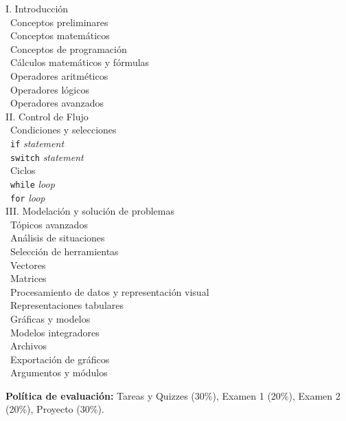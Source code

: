 \documentclass[12pt, letterpaper, oneside]{article}
\newcommand{\topic}{{\color{darkgreen}{\Rectangle}}}
\newcommand{\subtopic}{{\enskip \color{darkblue}{\Rectangle}}}
\begin{document}
  \begin{center} 
  \begin{minipage}{5in}
  \begin{flushleft}
  {\large I. Introducción} \\[2ex]
  \topic ~Conceptos preliminares \\
  \subtopic ~Conceptos matemáticos \\
  \subtopic ~Conceptos de programación \\
  \topic ~Cálculos matemáticos y fórmulas \\
  \subtopic ~Operadores aritméticos \\
  \subtopic ~Operadores lógicos \\
  \subtopic ~Operadores avanzados \\[2.5ex]
  {\large II. Control de Flujo } \\[2ex]
  \topic ~Condiciones y selecciones \\
  \subtopic ~\texttt{if} \textit{statement} \\
  \subtopic ~\texttt{switch} \textit{statement} \\
  \topic ~Ciclos \\
  \subtopic ~\texttt{while} \textit{loop} \\
  \subtopic ~\texttt{for} \textit{loop}\\[2.5ex]
  {\large III. Modelación y solución de problemas} \\[2ex]
  \topic ~Tópicos avanzados \\
  \subtopic ~Análisis de situaciones \\
  \subtopic ~Selección de herramientas \\
  \subtopic ~Vectores \\
  \subtopic ~Matrices \\
  \topic ~Procesamiento de datos y representación visual \\
  \subtopic ~Representaciones tabulares \\
  \subtopic ~Gráficas y modelos \\
  \topic ~Modelos integradores \\
  \subtopic ~Archivos \\
  \subtopic ~Exportación de gráficos \\
  \subtopic ~Argumentos y módulos
  \end{flushleft}
  \end{minipage}
  \end{center}

  \vspace*{.15in}
  \noindent\textbf{Política de evaluación:}
  Tareas y Quizzes (30\%), Examen 1 (20\%), Examen 2 (20\%), Proyecto (30\%).
  
\end{document}
